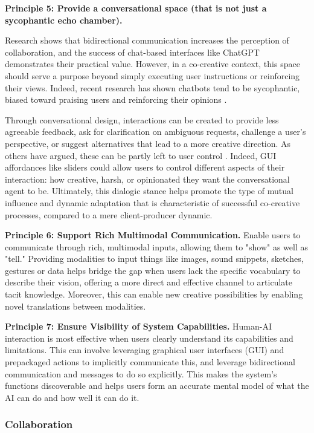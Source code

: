 \textbf{Principle 5: Provide a conversational space (that is not just a sycophantic echo chamber).}

Research shows that bidirectional communication increases the perception of collaboration, and the success of chat-based interfaces like ChatGPT demonstrates their practical value. However, in a co-creative context, this space should serve a purpose beyond simply executing user instructions or reinforcing their views. Indeed, recent research has shown chatbots tend to be sycophantic, biased toward praising users and reinforcing their opinions \cite{Sharma2023-or, OpenAI2025-wr}.

Through conversational design, interactions can be created to provide less agreeable feedback, ask for clarification on ambiguous requests, challenge a user's perspective, or suggest alternatives that lead to a more creative direction. As others have argued, these can be partly left to user control \cite{Moruzzi2024-cq}. Indeed, GUI affordances like sliders could allow users to control different aspects of their interaction: how creative, harsh, or opinionated they want the conversational agent to be. Ultimately, this dialogic stance helps promote the type of mutual influence and dynamic adaptation that is characteristic of successful co-creative processes, compared to a mere client-producer dynamic.

\textbf{Principle 6: Support Rich Multimodal Communication.} Enable users to communicate through rich, multimodal inputs, allowing them to "show" as well as "tell." Providing modalities to input things like images, sound snippets, sketches, gestures or data helps bridge the gap when users lack the specific vocabulary to describe their vision, offering a more direct and effective channel to articulate tacit knowledge. Moreover, this can enable new creative possibilities by enabling novel translations between modalities. 

\textbf{Principle 7: Ensure Visibility of System Capabilities.} Human-AI interaction is most effective when users clearly understand its capabilities and limitations. This can involve leveraging graphical user interfaces (GUI) and prepackaged actions to implicitly communicate this, and leverage bidirectional communication and messages to do so explicitly. This makes the system's functions discoverable and helps users form an accurate mental model of what the AI can do and how well it can do it.

\subsubsection{Collaboration}

